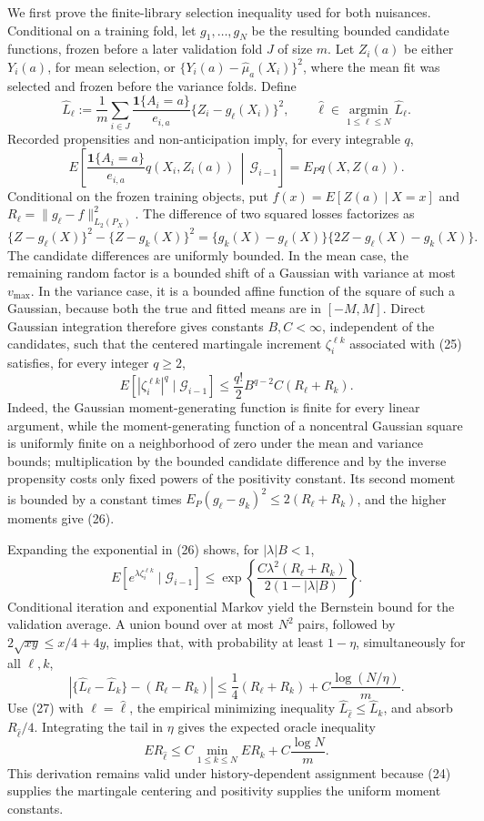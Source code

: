 We first prove the finite-library selection inequality used for both nuisances.  Conditional on a training fold, let \(g_1,\ldots,g_N\) be the resulting bounded candidate functions, frozen before a later validation fold \(J\) of size \(m\).  Let \(Z_i(a)\) be either \(Y_i(a)\), for mean selection, or
\(\{Y_i(a)-\widehat\mu_a(X_i)\}^2\), where the mean fit was selected and frozen before the variance folds.  Define
\[
\widehat L_\ell:=\frac1m\sum_{i\in J}
\frac{\mathbf 1\{A_i=a\}}{e_{i,a}}
\{Z_i-g_\ell(X_i)\}^2,
\qquad
\widehat\ell\in\operatorname*{argmin}_{1\leq\ell\leq N}\widehat L_\ell.
\tag{23}
\]
Recorded propensities and non-anticipation imply, for every integrable \(q\),
\[
E\!\left[
\frac{\mathbf 1\{A_i=a\}}{e_{i,a}}q(X_i,Z_i(a))
\,\middle|\,\mathcal G_{i-1}
\right]
=E_Pq(X,Z(a)).
\tag{24}
\]
Conditional on the frozen training objects, put \(f(x)=E[Z(a)\mid X=x]\) and
\(R_\ell=\|g_\ell-f\|_{L_2(P_X)}^2\).  The difference of two squared losses factorizes as
\[
\{Z-g_\ell(X)\}^2-\{Z-g_k(X)\}^2
=\{g_k(X)-g_\ell(X)\}\{2Z-g_\ell(X)-g_k(X)\}.
\tag{25}
\]
The candidate differences are uniformly bounded.  In the mean case, the remaining random factor is a bounded shift of a Gaussian with variance at most \(v_{\max}\).  In the variance case, it is a bounded affine function of the square of such a Gaussian, because both the true and fitted means are in \([-M,M]\).  Direct Gaussian integration therefore gives constants \(B,C<\infty\), independent of the candidates, such that the centered martingale increment \(\zeta_i^{\ell k}\) associated with (25) satisfies, for every integer \(q\geq2\),
\[
E[|\zeta_i^{\ell k}|^q\mid\mathcal G_{i-1}]
\leq\frac{q!}{2}B^{q-2}C(R_\ell+R_k).
\tag{26}
\]
Indeed, the Gaussian moment-generating function is finite for every linear argument, while the moment-generating function of a noncentral Gaussian square is uniformly finite on a neighborhood of zero under the mean and variance bounds; multiplication by the bounded candidate difference and by the inverse propensity costs only fixed powers of the positivity constant.  Its second moment is bounded by a constant times
\(E_P(g_\ell-g_k)^2\leq2(R_\ell+R_k)\), and the higher moments give (26).

Expanding the exponential in (26) shows, for \(|\lambda|B<1\),
\[
E[e^{\lambda\zeta_i^{\ell k}}\mid\mathcal G_{i-1}]
\leq
\exp\!\left\{
\frac{C\lambda^2(R_\ell+R_k)}{2(1-|\lambda|B)}
\right\}.
\]
Conditional iteration and exponential Markov yield the Bernstein bound for the validation average.  A union bound over at most \(N^2\) pairs, followed by
\(2\sqrt{xy}\leq x/4+4y\), implies that, with probability at least \(1-\eta\), simultaneously for all \(\ell,k\),
\[
\left|\{\widehat L_\ell-\widehat L_k\}-(R_\ell-R_k)\right|
\leq\frac14(R_\ell+R_k)
+C\frac{\log(N/\eta)}m.
\tag{27}
\]
Use (27) with \(\ell=\widehat\ell\), the empirical minimizing inequality
\(\widehat L_{\widehat\ell}\leq\widehat L_k\), and absorb \(R_{\widehat\ell}/4\).  Integrating the tail in \(\eta\) gives the expected oracle inequality
\[
E R_{\widehat\ell}
\leq C\min_{1\leq k\leq N}ER_k
+C\frac{\log N}{m}.
\tag{28}
\]
This derivation remains valid under history-dependent assignment because (24) supplies the martingale centering and positivity supplies the uniform moment constants.


